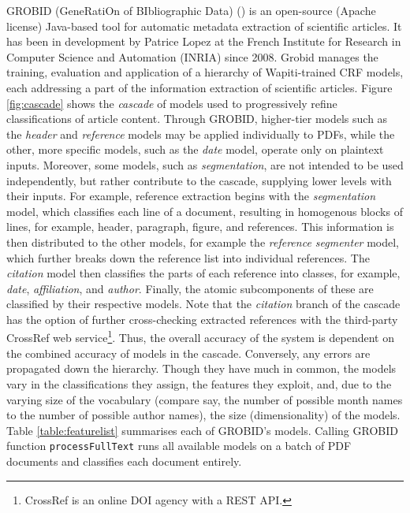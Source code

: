 GROBID (GeneRatiOn of BIbliographic Data) (\cite{lopez2009grobid}) is an open-source (Apache license) Java-based tool for automatic metadata extraction of scientific articles. It has been in development by Patrice Lopez at the French Institute for Research in Computer Science and Automation (INRIA) since 2008. Grobid manages the training, evaluation and application of a hierarchy of Wapiti-trained CRF models, each addressing a part of the information extraction of scientific articles. Figure \ref{fig:cascade} shows the \emph{cascade} of models used to progressively refine classifications of article content. Through GROBID, higher-tier models such as the \emph{header} and \emph{reference} models may be applied individually to PDFs, while the other, more specific models, such as the \emph{date} model, operate only on plaintext inputs. Moreover, some models, such as \emph{segmentation}, are not intended to be used independently, but rather contribute to the cascade, supplying lower levels with their inputs. For example, reference extraction begins with the \emph{segmentation} model, which classifies each line of a document, resulting in homogenous blocks of lines, for example, header, paragraph, figure, and references. This information is then distributed to the other models, for example the \emph{reference segmenter} model, which further breaks down the reference list into individual references. The \emph{citation} model then classifies the parts of each reference into classes, for example, \emph{date}, \emph{affiliation}, and \emph{author}. Finally, the atomic subcomponents of these are classified by their respective models. Note that the \emph{citation} branch of the cascade has the option of further cross-checking extracted references with the third-party CrossRef web service\footnote{CrossRef is an online DOI agency with a REST API.}. Thus, the overall accuracy of the system is dependent on the combined accuracy of models in the cascade. Conversely, any errors are propagated down the hierarchy. Though they have much in common, the models vary in the classifications they assign, the features they exploit, and, due to the varying size of the vocabulary (compare say, the number of possible month names to the number of possible author names), the size (dimensionality) of the models. Table \ref{table:featurelist} summarises each of GROBID's models. Calling GROBID function \texttt{processFullText} runs all available models on a batch of PDF documents and classifies each document entirely.

